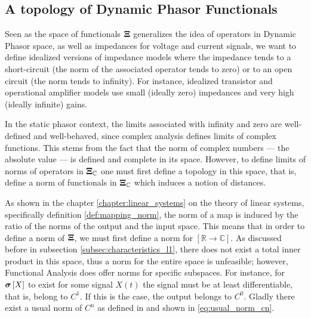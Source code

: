 \subsection{A topology of Dynamic Phasor Functionals}\label{subsec:topology_dpfs} %

	Seen as the space of functionals $\boldsymbol{\Xi}$ generalizes the idea of operators in Dynamic Phasor space, as well as impedances for voltage and current signals, we want to define idealized versions of impedance models where the impedance tends to a short-circuit (the norm of the associated operator tends to zero) or to an open circuit (the norm tends to infinity). For instance, idealized transistor and operational amplifier models use small (ideally zero) impedances and very high (ideally infinite) gains.

	In the static phasor context, the limits associated with infinity and zero are well-defined and well-behaved, since complex analysis defines limits of complex functions. This stems from the fact that the norm of complex numbers — the absolute value — is defined and complete in its space. However, to define limits of norms of operators in $\boldsymbol{\Xi}_\mathbb{C}$ one must first define a topology in this space, that is, define a norm of functionals in $\boldsymbol{\Xi}_\mathbb{C}$ which induces a notion of distances.

	As shown in the chapter \ref{chapter:linear_systems} on the theory of linear systems, specifically definition \ref{def:mapping_norm}, the norm of a map is induced by the ratio of the norms of the output and the input space. This means that in order to define a norm of $\boldsymbol{\Xi}$, we must first define a norm for $\left[\mathbb{R}\to\mathbb{C}\right]$. As discussed before in subsection \ref{subsec:characteristics_l1}, there does not exist a total inner product in this space, thus a norm for the entire space is unfeasible; however, Functional Analysis does offer norms for specific subspaces. For instance, for $\boldsymbol{\sigma}\left[X\right]$ to exist for some signal $X(t)$ the signal must be at least differentiable, that is, belong to $C^1$. If this is the case, the output belongs to $C^0$. Gladly there exist a usual norm of $C^n$ as defined in \cite{rudin1991functional} and shown in \eqref{eq:usual_norm_cn}.

